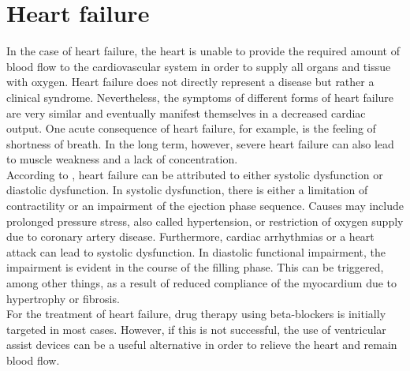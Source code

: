 \section{Heart failure}
In the case of heart failure, the heart is unable to provide the required amount of blood flow to the cardiovascular system in order to supply all organs and tissue with oxygen.
Heart failure does not directly represent a disease but rather a clinical syndrome. Nevertheless, the symptoms of different forms of heart failure are very similar and eventually manifest themselves in a decreased cardiac output. One acute consequence of heart failure, for example, is the feeling of shortness of breath. In the long term, however, severe heart failure can also lead to muscle weakness and a lack of concentration.
\\According to \cite{HKS4}, heart failure can be attributed to either systolic dysfunction or diastolic dysfunction. In systolic dysfunction, there is either a limitation of contractility or an impairment of the ejection phase sequence. Causes may include prolonged pressure stress, also called hypertension, or restriction of oxygen supply due to coronary artery disease. Furthermore, cardiac arrhythmias or a heart attack can lead to systolic dysfunction. In diastolic functional impairment, the impairment is evident in the course of the filling phase. This can be triggered, among other things, as a result of reduced compliance of the myocardium due to hypertrophy or fibrosis.
\\For the treatment of heart failure, drug therapy using beta-blockers is initially targeted in most cases. However, if this is not successful, the use of ventricular assist devices can be a useful alternative in order to relieve the heart and remain blood flow. \cite{HKS4}
